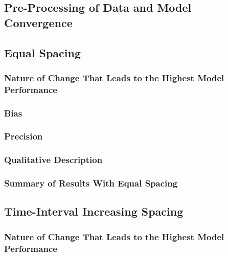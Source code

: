 \documentclass[
12pt, %
twoside,
english]{guelphthesis}
\begin{document}
\hypertarget{pre-processing-of-data-and-model-convergence}{%
\subsection{Pre-Processing of Data and Model Convergence}\label{pre-processing-of-data-and-model-convergence}}

\hypertarget{concise-tab}{%
\subsection{Equal Spacing}\label{concise-tab}}

\hypertarget{nature-change-equal-exp1}{%
\subsubsection{Nature of Change That Leads to the Highest Model Performance}\label{nature-change-equal-exp1}}

\hypertarget{bias-equal-exp1}{%
\subsubsection{Bias}\label{bias-equal-exp1}}

\hypertarget{precision-equal-exp1}{%
\subsubsection{Precision}\label{precision-equal-exp1}}

\hypertarget{qualitative-equal-exp1}{%
\subsubsection{Qualitative Description}\label{qualitative-equal-exp1}}

\hypertarget{summary-of-results-with-equal-spacing}{%
\subsubsection{Summary of Results With Equal Spacing}\label{summary-of-results-with-equal-spacing}}

\hypertarget{time-interval-increasing-spacing}{%
\subsection{Time-Interval Increasing Spacing}\label{time-interval-increasing-spacing}}

\hypertarget{nature-change-time-inc-exp1}{%
\subsubsection{Nature of Change That Leads to the Highest Model Performance}\label{nature-change-time-inc-exp1}}
\end{document}
